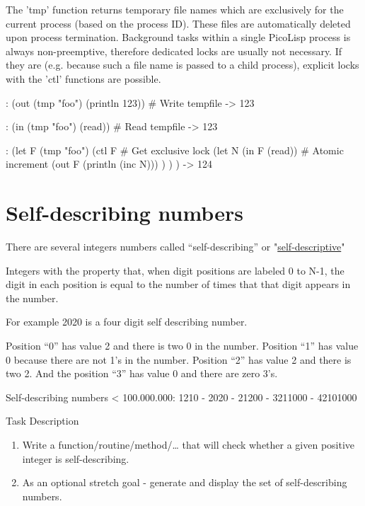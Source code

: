 \begin{wideverbatim}

The 'tmp' function returns temporary file names which are exclusively for the
current process (based on the process ID). These files are automatically deleted
upon process termination. Background tasks within a single PicoLisp process is
always non-preemptive, therefore dedicated locks are usually not necessary. If
they are (e.g. because such a file name is passed to a child process), explicit
locks with the 'ctl' functions are possible.

: (out (tmp "foo") (println 123))         # Write tempfile
-> 123

: (in (tmp "foo") (read))                 # Read tempfile
-> 123

: (let F (tmp "foo")
   (ctl F                                 # Get exclusive lock
      (let N (in F (read))                # Atomic increment
         (out F (println (inc N))) ) ) )
-> 124

\end{wideverbatim}

\pagebreak{}
\section*{Self-describing numbers}

There are several integers numbers called ``self-describing'' or
"\href{http://en.wikipedia.org/wiki/Self-descriptive\_number}{self-descriptive}"

Integers with the property that, when digit positions are labeled 0 to
N-1, the digit in each position is equal to the number of times that
that digit appears in the number.

For example 2020 is a four digit self describing number.

Position ``0'' has value 2 and there is two 0 in the number. Position
``1'' has value 0 because there are not 1's in the number. Position
``2'' has value 2 and there is two 2. And the position ``3'' has value 0
and there are zero 3's.

Self-describing numbers \textless{} 100.000.000: 1210 - 2020 - 21200 -
3211000 - 42101000

Task Description

\begin{enumerate}
\item
  Write a function/routine/method/\ldots{} that will check whether a
  given positive integer is self-describing.
\item
  As an optional stretch goal - generate and display the set of
  self-describing numbers.
\end{enumerate}



